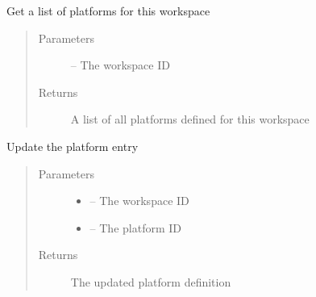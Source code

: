 \documentclass[letterpaper,10pt,english]{sphinxmanual}
\begin{document}
\begin{fulllineitems}
\label{_source/son_editor.impl:son_editor.impl.platformsimpl.get_platforms}
Get a list of platforms for this workspace
\begin{quote}\begin{description}
\item[{Parameters}] \leavevmode
{} -- The workspace ID

\item[{Returns}] \leavevmode
A list of all platforms defined for this workspace

\end{description}\end{quote}

\end{fulllineitems}


\begin{fulllineitems}
\label{_source/son_editor.impl:son_editor.impl.platformsimpl.update_platform}
Update the platform entry
\begin{quote}\begin{description}
\item[{Parameters}] \leavevmode\begin{itemize}
\item {} 
 -- The workspace ID

\item {} 
 -- The platform ID

\end{itemize}

\item[{Returns}] \leavevmode
The updated platform definition

\end{description}\end{quote}

\end{fulllineitems}
\end{document}
